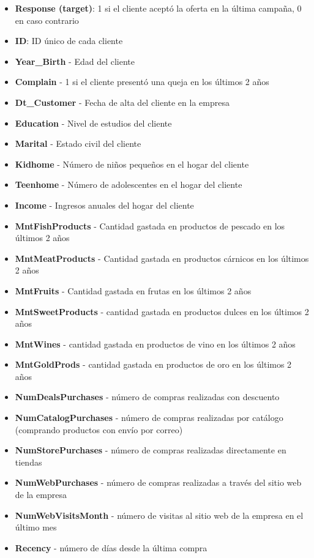 \documentclass[
  letterpaper,
  DIV=11,
  numbers=noendperiod]{scrartcl}
\providecommand{\tightlist}{%
  \setlength{\itemsep}{0pt}\setlength{\parskip}{0pt}}\usepackage{longtable,booktabs,array}
\begin{document}
\begin{itemize}
\tightlist
\item
  \textbf{Response (target)}: 1 si el cliente aceptó la oferta en la
  última campaña, 0 en caso contrario
\item
  \textbf{ID}: ID único de cada cliente
\item
  \textbf{Year\_Birth} - Edad del cliente
\item
  \textbf{Complain} - 1 si el cliente presentó una queja en los últimos
  2 años
\item
  \textbf{Dt\_Customer} - Fecha de alta del cliente en la empresa
\item
  \textbf{Education} - Nivel de estudios del cliente
\item
  \textbf{Marital} - Estado civil del cliente
\item
  \textbf{Kidhome} - Número de niños pequeños en el hogar del cliente
\item
  \textbf{Teenhome} - Número de adolescentes en el hogar del cliente
\item
  \textbf{Income} - Ingresos anuales del hogar del cliente
\item
  \textbf{MntFishProducts} - Cantidad gastada en productos de pescado en
  los últimos 2 años
\item
  \textbf{MntMeatProducts} - Cantidad gastada en productos cárnicos en
  los últimos 2 años
\item
  \textbf{MntFruits} - Cantidad gastada en frutas en los últimos 2 años
\item
  \textbf{MntSweetProducts} - cantidad gastada en productos dulces en
  los últimos 2 años
\item
  \textbf{MntWines} - cantidad gastada en productos de vino en los
  últimos 2 años
\item
  \textbf{MntGoldProds} - cantidad gastada en productos de oro en los
  últimos 2 años
\item
  \textbf{NumDealsPurchases} - número de compras realizadas con
  descuento
\item
  \textbf{NumCatalogPurchases} - número de compras realizadas por
  catálogo (comprando productos con envío por correo)
\item
  \textbf{NumStorePurchases} - número de compras realizadas directamente
  en tiendas
\item
  \textbf{NumWebPurchases} - número de compras realizadas a través del
  sitio web de la empresa
\item
  \textbf{NumWebVisitsMonth} - número de visitas al sitio web de la
  empresa en el último mes
\item
  \textbf{Recency} - número de días desde la última compra
\end{itemize}
\end{document}
